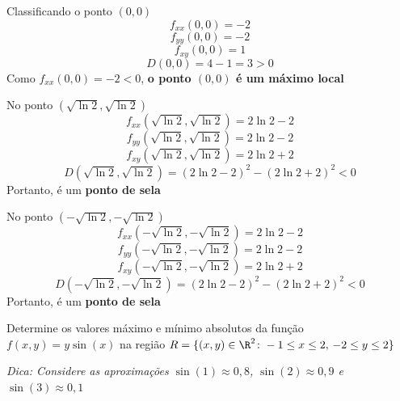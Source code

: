 \documentclass[a4paper,12pt,fleqn]{article}
\begin{document}
\begin{answer}
  \bigskip
  Classificando o ponto \((0, 0)\)
  \[
    f_{xx}(0, 0) = -2
  \]
  \[
    f_{yy}(0, 0) = -2
  \]
  \[
    f_{xy}(0, 0) =  1
  \]
  \[
    D(0, 0) = 4-1 = 3 > 0
  \]
  Como \(f_{xx}(0, 0) = -2 < 0\), \textbf{o ponto \((0,0)\) é um máximo local}

  \bigskip
  No ponto \(\left(\sqrt{\ln 2}, \sqrt{\ln 2}\right)\)
  \[
    f_{xx}\left(\sqrt{\ln 2}, \sqrt{\ln 2}\right)
    = 2\ln 2 -2
  \]
  \[
    f_{yy}\left(\sqrt{\ln 2}, \sqrt{\ln 2}\right)
    = 2\ln 2 -2
  \]
  \[
    f_{xy}\left(\sqrt{\ln 2}, \sqrt{\ln 2}\right)
    = 2\ln 2 +2
  \]
  \[
    D\left(\sqrt{\ln 2}, \sqrt{\ln 2}\right)
    = (2\ln 2 -2)^2 - (2\ln 2 +2)^2
    < 0
  \]
  Portanto, é um \textbf{ponto de sela}

  \bigskip
  No ponto \(\left(-\sqrt{\ln 2}, -\sqrt{\ln 2}\right)\)
  \[
    f_{xx}\left(-\sqrt{\ln 2}, -\sqrt{\ln 2}\right)
    = 2\ln 2 -2
  \]
  \[
    f_{yy}\left(-\sqrt{\ln 2}, -\sqrt{\ln 2}\right)
    = 2\ln 2 -2
  \]
  \[
    f_{xy}\left(-\sqrt{\ln 2}, -\sqrt{\ln 2}\right)
    = 2\ln 2 +2
  \]
  \[
    D\left(-\sqrt{\ln 2}, -\sqrt{\ln 2}\right)
    = (2\ln 2 -2)^2 - (2\ln 2 +2)^2
    < 0
  \]
  Portanto, é um \textbf{ponto de sela}

\end{answer}

Determine os valores máximo e mínimo absolutos da função
\(
  f(x, y) = y\sin(x)
\)
na região
\(
  R = \{(x,y)\in\R^2\colon -1 \le x \le 2,\, -2 \le y \le 2\}
\)

\textit{Dica: Considere as aproximações
\(\sin(1)\approx 0,8\),
\(\sin(2)\approx 0,9\) e
\(\sin(3)\approx 0,1\)}

\clearpagequestiononly
\end{document}
